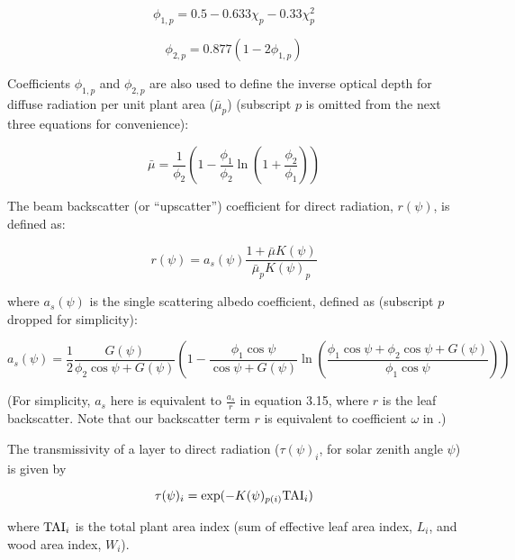 \begin{equation}
  \phi_{1,p} = 0.5 - 0.633 \chi_{p} - 0.33 \chi_{p}^2
\end{equation}

\begin{equation}
  \phi_{2,p} = 0.877 (1 - 2 \phi_{1,p})
\end{equation}

Coefficients $\phi_{1,p}$ and $\phi_{2,p}$ are also used to define the inverse optical depth for diffuse radiation per unit plant area ($\bar\mu_{p}$) (subscript $p$ is omitted from the next three equations for convenience):

\begin{equation}
  \bar\mu = \frac{1}{\phi_{2}}\left( 1 - \frac{\phi_{1}}{\phi_{2}} \ln\left( 1 + \frac{\phi_{2}}{\phi_{1}}\right) \right)
\end{equation}

The beam backscatter (or ``upscatter'') coefficient for direct radiation, $r(\psi)$, is defined as:

\begin{equation}
  r(\psi) = a_s(\psi) \frac{1 + \bar\mu K(\psi)}{\bar\mu_{p} K(\psi)_{p}}
\end{equation}

where $a_s(\psi)$ is the single scattering albedo coefficient, defined as (subscript $p$ dropped for simplicity):

\begin{equation}
  a_s(\psi) = \frac{1}{2}
  \frac{G(\psi)}{\phi_2 \cos\psi + G(\psi)}
  \left(
    1 -
    \frac{\phi_1 \cos\psi}{\cos\psi + G(\psi)}
    \ln\left(
      \frac{\phi_1 \cos\psi + \phi_2 \cos\psi + G(\psi)}{\phi_1 \cos\psi}
    \right)
  \right)
\end{equation}

(For simplicity, $a_s$ here is equivalent to $\frac{a_s}{r}$ in \citet{clm45_note} equation 3.15, where $r$ is the leaf backscatter.
Note that our backscatter term $r$ is equivalent to coefficient $\omega$ in \citet{clm45_note}.)

The transmissivity of a layer to direct radiation ($\tau(\psi)_i$, for solar zenith angle $\psi$) is given by

\begin{equation}
  \tau(\psi)_i = \exp(-K(\psi)_{p(i)} \mathrm{TAI}_i)
\end{equation}

where $\mathrm{TAI}_{i}$ is the total plant area index (sum of effective leaf area index, $L_{i}$, and wood area index, $W_{i}$).

